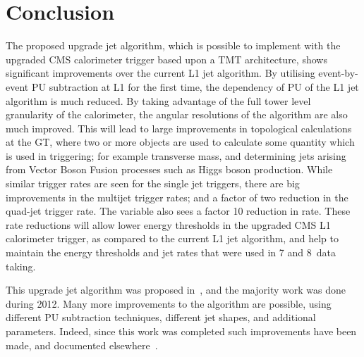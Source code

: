 \section{Conclusion}
The proposed upgrade jet algorithm, which is possible to implement with the upgraded \ac{CMS} calorimeter trigger based upon a \ac{TMT} architecture, shows significant improvements over the current \ac{L1} jet algorithm.
By utilising event-by-event \ac{PU} subtraction at \ac{L1} for the first time, the dependency of \ac{PU} of the \ac{L1} jet algorithm is much reduced.
By taking advantage of the full tower level granularity of the calorimeter, the angular resolutions of the algorithm are also much improved.
This will lead to large improvements in topological calculations at the \ac{GT}, where two or more objects are used to calculate some quantity which is used in triggering; for example transverse mass, and determining jets arising from Vector Boson Fusion processes such as Higgs boson production.
While similar trigger rates are seen for the single jet triggers, there are big improvements in the multijet trigger rates; and a factor of two reduction in the quad-jet trigger rate.
The \HT variable also sees a factor 10 reduction in rate.
These rate reductions will allow lower energy thresholds in the upgraded \ac{CMS} \ac{L1} calorimeter trigger, as compared to the current \ac{L1} jet algorithm, and help to maintain the energy thresholds and jet rates that were used in 7 and 8~\TeV data taking.


This upgrade jet algorithm was proposed in~\cite{Tapper:1556311}, and the majority work was done during 2012. 
Many more improvements to the algorithm are possible, using different \ac{PU} subtraction techniques, different jet shapes, and additional parameters.
Indeed, since this work was completed such improvements have been made, and documented elsewhere~\cite{newL1jetWork}.

